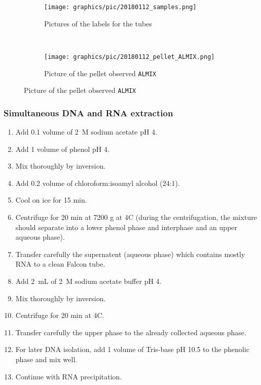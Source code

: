 \begin{figure}[H] %
    \centering
    \caption{Pictures of the samples.}
    \label{fig:20180112_smp}
    \begin{subfigure}[b]{0.49\textwidth}
        \texttt{[image: graphics/pic/20180112\_samples.png]}
        \caption{Pictures of the labels for the tubes}
        \label{sfig:20180112_samples}
    \end{subfigure}
    ~ 
    \begin{subfigure}[b]{0.49\textwidth}
        \texttt{[image: graphics/pic/20180112\_pellet\_ALMIX.png]}
        \caption{Picture of the pellet observed \texttt{ALMIX}}
        \label{sfig:20180112_pellet_ALMIX}
    \end{subfigure}
\end{figure}

\subsubsection{Simultaneous DNA and RNA extraction}
\begin{enumerate}
\item Add 0.1 volume of 2~M sodium acetate pH 4.
\item Add 1 volume of phenol pH 4.
\item Mix thoroughly by inversion.
\item Add 0.2 volume of chloroform:isoamyl alcohol (24:1).
\item Cool on ice for 15 min.
\item Centrifuge for 20 min at 7200 g at 4\degree C (during the centrifugation, the mixture should separate into a lower phenol phase and interphase and an upper aqueous phase).
\item Transfer carefully the supernatent (aqueous phase) which contains mostly RNA to a clean Falcon tube.
\item Add 2~mL of 2~M sodium acetate buffer pH 4.
\item Mix thoroughly by inversion.
\item Centrifuge for 20 min at 4\degree C.
\item Transfer carefully the upper phase to the already collected aqueous phase.
\item For later DNA isolation, add 1 volume of Tris-base pH 10.5 to the phenolic phase and mix well.
\item Continue with RNA precipitation. 
\end{enumerate}


